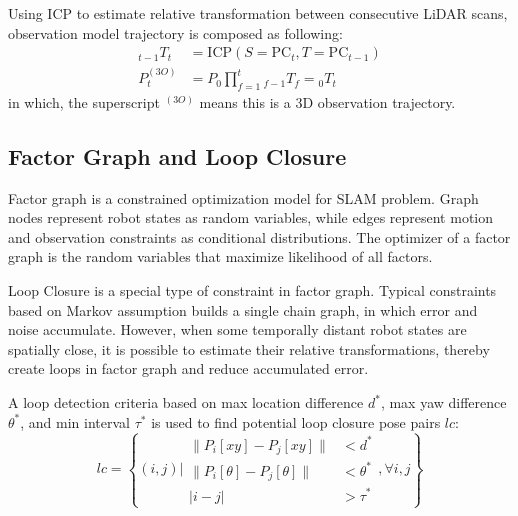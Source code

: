 \documentclass[conference]{IEEEtran}
\begin{document}
Using ICP to estimate relative transformation between consecutive LiDAR scans,
observation model trajectory is composed as following:
$$
\begin{aligned}
    _{t-1}T_{t}
        &=\text{ICP}(S=\mathrm{PC}_{t}, T=\mathrm{PC}_{t-1}) \\ 
    P^{(3O)}_{t}
        &=P_{0}\prod^{t}_{f=1} {}_{f-1}T_{f} = {}_{0}T_{t}
\end{aligned} 
$$
in which, the superscript $^{(3O)}$ means this is a 3D observation trajectory.

\subsection{Factor Graph and Loop Closure}
Factor graph is a constrained optimization model for SLAM problem.
Graph nodes represent robot states as random variables,
while edges represent motion and observation constraints as conditional distributions.
The optimizer of a factor graph is the random variables that maximize likelihood of all factors.

Loop Closure is a special type of constraint in factor graph.
Typical constraints based on Markov assumption builds a single chain graph, 
in which error and noise accumulate.
However, when some temporally distant robot states are spatially close,
it is possible to estimate their relative transformations,
thereby create loops in factor graph and reduce accumulated error.

A loop detection criteria based on max location difference $d^*$, 
max yaw difference $\theta^*$, and min interval $\tau^*$
is used to find potential loop closure pose pairs $lc$:
$$
lc = \left\{(i, j) \bigg| 
\begin{aligned}
    \| P_{i}[xy]-P_{j}[xy]\| &< d^*\\ 
    \| P_{i}[\theta]-P_{j}[\theta]\| &< \theta^* \\
    |i-j|&>\tau^*
\end{aligned} 
, \forall i, j\right\}
$$
\end{document}
